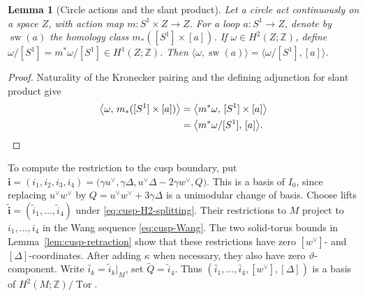 \documentclass[11pt]{article}
\newtheorem{lemma}[theorem]{Lemma}
\theoremstyle{definition}
\theoremstyle{remark}
\numberwithin{equation}{section}
\begin{document}
\medskip
\begin{lemma}[Circle actions and the slant product]\label{lem:sweeping-slant}
Let a circle act continuously on a space $Z$, with action map
$m:S^1\times Z\to Z$.  For a loop $a:S^1\to Z$, denote by
$\operatorname{sw}(a)$ the homology class
$m_*([S^1]\times[a])$.  If $\omega\in H^2(Z;\mathbb Z)$, define
$\omega/[S^1]=m^*\omega/[S^1]\in H^1(Z;\mathbb Z)$.  Then
$\langle\omega,\operatorname{sw}(a)\rangle
=\langle\omega/[S^1],[a]\rangle$.
\end{lemma}

\begin{proof}
Naturality of the Kronecker pairing and the defining adjunction for slant
product give
\[
 \begin{aligned}
 \bigl\langle\omega,\,
   m_*([S^1]\times[a])\bigr\rangle
 &=\bigl\langle m^*\omega,\,[S^1]\times[a]\bigr\rangle\\
 &=\bigl\langle m^*\omega/[S^1],\,[a]\bigr\rangle .
 \end{aligned}\qedhere
\]
\end{proof}

To compute the restriction to the cusp boundary, put
$\mathbf i=(i_1,i_2,i_3,i_4)
=\bigl(\gamma u^\vee,\gamma\Delta,
u^\vee\Delta-2\gamma w^\vee,Q\bigr)$.
This is a basis of $I_0$, since replacing $u^\vee w^\vee$ by
$Q=u^\vee w^\vee+3\gamma\Delta$ is a unimodular change of basis.
Choose lifts
$\widetilde{\mathbf i}=(\widetilde i_1,\ldots,\widetilde i_4)$ under
\eqref{eq:cusp-H2-splitting}.  Their restrictions to $M$ project to
$i_1,\ldots,i_4$ in the Wang sequence \eqref{eq:cusp-Wang}.  The two
solid-torus bounds in Lemma~\ref{lem:cusp-retraction} show that these
restrictions have zero $[w^\vee]$- and $[\Delta]$-coordinates.  After
adding $\kappa$ when necessary, they also have zero
$\vartheta$-component.  Write
$\bar i_k=\widetilde i_k|_M$, set
$\widetilde Q=\widetilde i_4$.  Thus
$(\bar i_1,\ldots,\bar i_4,[w^\vee],[\Delta])$ is a basis of
$H^2(M;\mathbb Z)/\operatorname{Tor}$.
\end{document}
